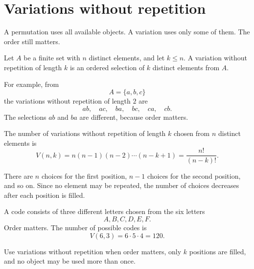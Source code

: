 \section{Variations without repetition}

A permutation uses all available objects. A variation uses only some of them. The order still matters.

\begin{definitionbox}
Let \(A\) be a finite set with \(n\) distinct elements, and let \(k\leq n\). A variation without repetition of length \(k\) is an ordered selection of \(k\) distinct elements from \(A\).
\end{definitionbox}

For example, from
\[
A=\{a,b,c\}
\]
the variations without repetition of length \(2\) are
\[
ab,\quad ac,\quad ba,\quad bc,\quad ca,\quad cb.
\]
The selections \(ab\) and \(ba\) are different, because order matters.

\begin{center}
\end{center}

\begin{theorembox}
The number of variations without repetition of length \(k\) chosen from \(n\) distinct elements is
\[
V(n,k)=n(n-1)(n-2)\cdots(n-k+1)=\frac{n!}{(n-k)!}.
\]
\end{theorembox}

There are \(n\) choices for the first position, \(n-1\) choices for the second position, and so on. Since no element may be repeated, the number of choices decreases after each position is filled.

\begin{examplebox}
A code consists of three different letters chosen from the six letters
\[
A,B,C,D,E,F.
\]
Order matters. The number of possible codes is
\[
V(6,3)=6\cdot5\cdot4=120.
\]
\end{examplebox}

\begin{remarkbox}
Use variations without repetition when order matters, only \(k\) positions are filled, and no object may be used more than once.
\end{remarkbox}
